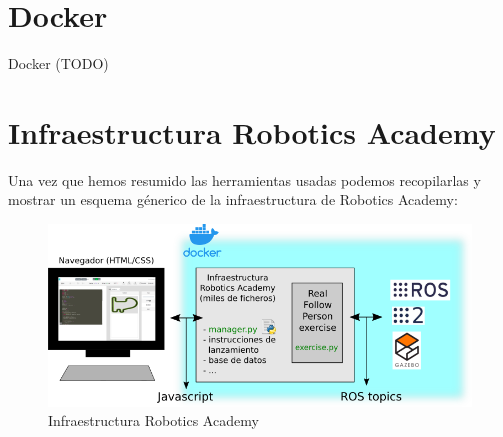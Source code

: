\section{Docker}
\label{sec:docker}

Docker (TODO)



\section{Infraestructura Robotics Academy}
\label{sec:infraestructura_robotics_academy}
Una vez que hemos resumido las herramientas usadas podemos recopilarlas y mostrar un esquema génerico de la infraestructura de Robotics Academy:

\begin{figure} [H]
  \begin{center}
    \includegraphics[width=15cm]{imagenes/esquema-robotics-academy.png}
  \end{center}
  \caption{Infraestructura Robotics Academy}
  \label{fig:infraestructura_robotics_academy}
\end{figure}\
